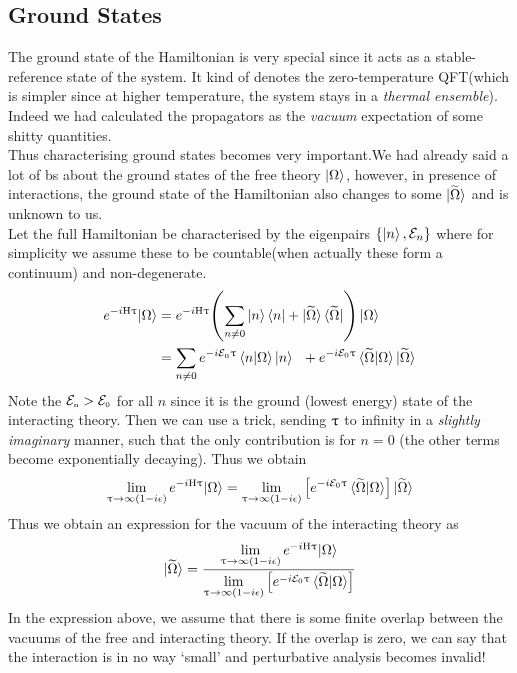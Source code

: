  \subsection{Ground States}
The ground state of the Hamiltonian is very special since it acts as a stable-reference state of the system. It kind of denotes the zero-temperature QFT(which is simpler since at higher temperature, the system stays in a \textit{thermal ensemble}). Indeed we had calculated the propagators as the \textit{vacuum} expectation of some shitty quantities. \\[0.2cm]
Thus characterising ground states becomes very important.We had already said a lot of bs about the ground states of the free theory $\ket{\Omega}$, however, in presence of interactions, the ground state of the Hamiltonian also changes to some $\ket{\widetilde{\Omega}}$ and is unknown to us. \\[0.2cm]
Let the full Hamiltonian be characterised by the eigenpairs $\{\ket{n}, \mathcal E_n\}$ where for simplicity we assume these to be countable(when actually these form a continuum) and non-degenerate. 
\begin{align*}
    e^{-i\mathrm{H} \uptau} {\ket{\Omega}} &= e^{-i\mathrm{H} \uptau}\qty(\sum\limits_{n\neq 0} \ket{n}\bra{n} + \ket{\widetilde{\Omega}} \bra{\widetilde{\Omega}}) \ket{\Omega}\\
    &=\sum\limits_{n\neq 0} e^{-i\mathcal E_{\text{\tiny n}} \uptau} \braket{n|\Omega} \ket{n} \ \ + e^{-i\mathcal E_{\text{\tiny 0}}\uptau} \braket{\widetilde{\Omega}|\Omega}\ket{\widetilde{\Omega}} 
\end{align*}
Note the $\mathcal E_{\text{\tiny n}} > \mathcal E_{\text{\tiny 0}}$ for all $n$ since it is the ground (lowest energy) state of the interacting theory. Then we can use a trick, sending $\uptau $ to infinity in a \textit{slightly imaginary} manner, such that the only contribution is for $n=0$ (the other terms become exponentially decaying). Thus we obtain 
$$\lim\limits_{\uptau \to \infty(1-i\epsilon)}  e^{-i\mathrm{H} \uptau} {\ket{\Omega}} = \lim\limits_{\uptau \to \infty(1-i\epsilon)} \qty[e^{-i\mathcal E_{\text{\tiny 0}}\uptau} \braket{\widetilde{\Omega}|\Omega}]\ket{\widetilde{\Omega}} $$
Thus we obtain an expression for the vacuum of the interacting theory as 
$$\ket{\widetilde{\Omega}} = \frac{\lim\limits_{\uptau \to \infty(1-i\epsilon)}  e^{-i\mathrm{H} \uptau} {\ket{\Omega}}}{\lim\limits_{\uptau \to \infty(1-i\epsilon)} \qty[e^{-i\mathcal E_{\text{\tiny 0}}\uptau} \braket{\widetilde{\Omega}|\Omega}]} $$
In the expression above, we assume that there is some finite overlap between the vacuums of the free and interacting theory. If the overlap is zero, we can say that the interaction is in no way `small' and perturbative analysis becomes invalid!\\[0.2cm]
